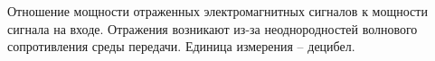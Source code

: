 Отношение мощности отраженных электромагнитных сигналов к 
мощности сигнала на входе. Отражения возникают из-за
неоднородностей волнового сопротивления среды передачи.
Единица измерения -- децибел.